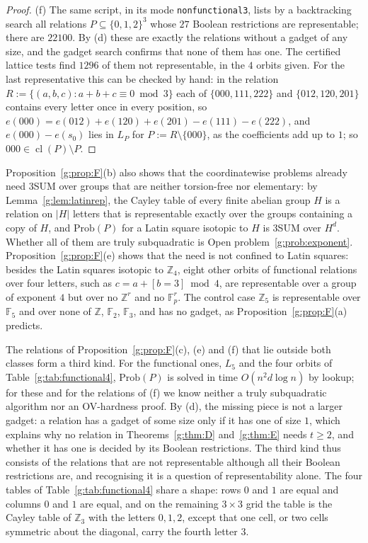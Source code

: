 \documentclass[11pt]{article}
\theoremstyle{definition}
\theoremstyle{remark}
\newcommand{\Z}{\mathbb{Z}}
\newcommand{\F}{\mathbb{F}_2}
\newcommand{\Fp}{\mathbb{F}_p}
\newcommand{\Prob}{\mathrm{Prob}}
\DeclareMathOperator{\cl}{cl}
\begin{document}
\begin{proof}
(f) The same script, in its mode \texttt{nonfunctional3}, lists by a backtracking search all relations $P\subseteq\{0,1,2\}^3$ whose $27$ Boolean restrictions are representable; there are $22100$. By (d) these are exactly the relations without a gadget of any size, and the gadget search confirms that none of them has one. The certified lattice tests find $1296$ of them not representable, in the $4$ orbits given. For the last representative this can be checked by hand: in the relation $R:=\{(a,b,c):a+b+c\equiv0\bmod3\}$ each of $\{000,111,222\}$ and $\{012,120,201\}$ contains every letter once in every position, so $e(000)=e(012)+e(120)+e(201)-e(111)-e(222)$, and $e(000)-e(s_0)$ lies in $L_P$ for $P:=R\setminus\{000\}$, as the coefficients add up to $1$; so $000\in\cl(P)\setminus P$.
\end{proof}

Proposition~\ref{g:prop:F}(b) also shows that the coordinatewise problems already need 3SUM over groups that are neither torsion-free nor elementary: by Lemma~\ref{g:lem:latinrep}, the Cayley table of every finite abelian group $H$ is a relation on $|H|$ letters that is representable exactly over the groups containing a copy of $H$, and $\Prob(P)$ for a Latin square isotopic to $H$ is 3SUM over $H^d$. Whether all of them are truly subquadratic is Open problem~\ref{g:prob:exponent}. Proposition~\ref{g:prop:F}(e) shows that the need is not confined to Latin squares: besides the Latin squares isotopic to $\Z_4$, eight other orbits of functional relations over four letters, such as $c=a+[b=3]\bmod4$, are representable over a group of exponent $4$ but over no $\Z^r$ and no $\Fp^r$. The control case $\Z_5$ is representable over $\mathbb F_5$ and over none of $\Z$, $\F$, $\mathbb F_3$, and has no gadget, as Proposition~\ref{g:prop:F}(a) predicts.

The relations of Proposition~\ref{g:prop:F}(c), (e) and (f) that lie outside both classes form a third kind. For the functional ones, $L_5$ and the four orbits of Table~\ref{g:tab:functional4}, $\Prob(P)$ is solved in time $O(n^2d\log n)$ by lookup; for these and for the relations of (f) we know neither a truly subquadratic algorithm nor an OV-hardness proof. By (d), the missing piece is not a larger gadget: a relation has a gadget of some size only if it has one of size $1$, which explains why no relation in Theorems~\ref{g:thm:D} and~\ref{g:thm:E} needs $t\ge2$, and whether it has one is decided by its Boolean restrictions. The third kind thus consists of the relations that are not representable although all their Boolean restrictions are, and recognising it is a question of representability alone. The four tables of Table~\ref{g:tab:functional4} share a shape: rows $0$ and $1$ are equal and columns $0$ and $1$ are equal, and on the remaining $3\times3$ grid the table is the Cayley table of $\Z_3$ with the letters $0,1,2$, except that one cell, or two cells symmetric about the diagonal, carry the fourth letter $3$.
\end{document}
